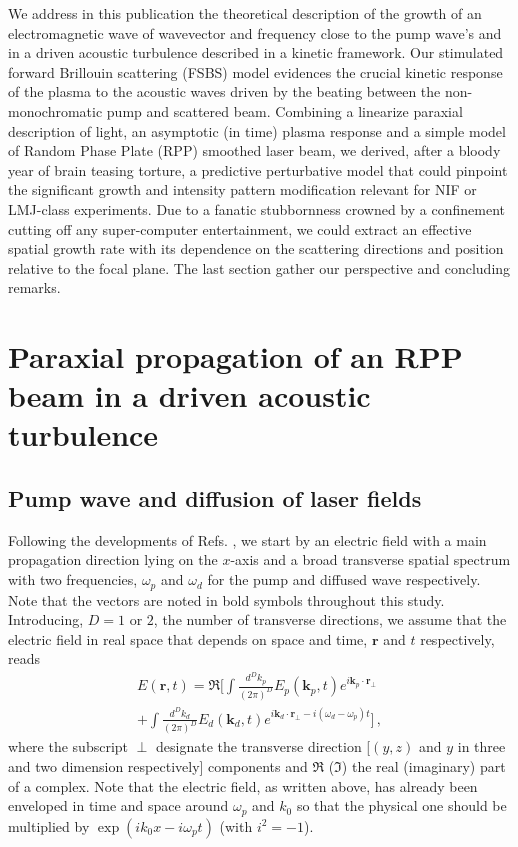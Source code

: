 \documentclass[
 reprint,
 amsmath,amssymb,
 aps,
]{revtex4-1}
\begin{document}
We address in this publication the theoretical description of  the growth of an electromagnetic wave of wavevector and frequency close to the pump wave's and in a driven acoustic turbulence described in a kinetic framework. 
Our stimulated forward Brillouin scattering (FSBS) model    evidences the crucial kinetic response of the plasma to the acoustic waves driven by the beating between the non-monochromatic pump and scattered beam. 
Combining a linearize paraxial description of light, an asymptotic (in time) plasma  response and a simple model of Random Phase Plate (RPP) smoothed laser beam, we derived, after a bloody year of brain teasing torture, a predictive perturbative model that could pinpoint the significant growth and intensity pattern modification relevant for NIF or LMJ-class experiments. 
Due to a fanatic stubbornness crowned by a confinement cutting off any super-computer entertainment, we could extract an effective spatial growth rate with its dependence on the scattering directions and position relative to the focal plane. 
The last section gather our perspective and concluding remarks. 

\section{Paraxial propagation of an RPP beam in a driven acoustic turbulence}
\subsection{Pump wave and diffusion of  laser fields}
Following the developments of Refs. \cite[]{phd-Grech}, we start by an electric field with a main propagation direction lying on the $x$-axis and a broad transverse spatial spectrum with two frequencies, $\omega_p$ and $\omega_d$ for the pump and diffused wave  respectively.  Note that the vectors are noted in bold symbols throughout this study. Introducing, $D=1$ or $2$, the number of transverse directions, we assume that the electric field in real space that depends on space and time, $\mathbf{r}$  and $t$ respectively, reads
\begin{align}
E(\mathbf{r},t)= \Re \Big[ \int \frac{d^Dk_p}{(2\pi)^D} E_p (\mathbf{k}_p,t) e^{i \mathbf{k}_p \cdot \mathbf{r}_\perp} \nonumber \\
+\int \frac{d^Dk_d}{(2\pi)^D} E_d (\mathbf{k}_d,t) e^{i \mathbf{k}_d \cdot \mathbf{r}_\perp -i (\omega_d - \omega_p)t}   \Big] \, ,
\end{align}
where the subscript $\perp$ designate the transverse direction [$(y,z)$ and $y$ in three and two dimension respectively]  components and $\Re$  ($\Im$) the real (imaginary) part of a complex. Note that the electric field, as written above,  has already been enveloped in time and space around $\omega_p$ and $k_0$ so that the physical one should be multiplied  by $\exp(ik_0 x-i\omega_p t)$ (with $i^2=-1$).
\end{document}
